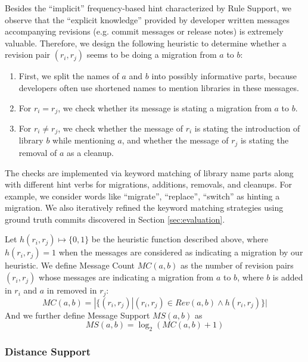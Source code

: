 \documentclass[conference, 10pt]{IEEEtran}
\begin{document}
Besides the ``implicit'' frequency-based hint characterized by Rule Support, we observe that the ``explicit knowledge'' provided by developer written messages accompanying revisions (e.g. commit messages or release notes) is extremely valuable.
Therefore, we design the following heuristic to determine whether a revision pair $(r_i, r_j)$ seems to be doing a migration from $a$ to $b$:
\begin{enumerate}
    \item First, we split the names of $a$ and $b$ into possibly informative parts, because developers often use shortened names to mention libraries in these messages.
    \item For $r_i = r_j$, we check whether its message is stating a migration from $a$ to $b$.
    \item For $r_i \ne r_j$, we check whether the message of $r_i$ is stating the introduction of library $b$ while mentioning $a$, and whether the message of $r_j$ is stating the removal of $a$ as a cleanup.
\end{enumerate}
The checks are implemented via keyword matching of library name parts along with different hint verbs for migrations, additions, removals, and cleanups. 
For example, we consider words like ``migrate'', ``replace'', ``switch'' as hinting a migration. 
We also iteratively refined the keyword matching strategies using ground truth commits discovered in Section \ref{sec:evaluation}.

Let $h(r_i, r_j)\mapsto \{0,1\}$ be the heuristic function described above, where $h(r_i,r_j)=1$ when the messages are considered as indicating a migration by our heuristic.
We define Message Count $MC(a,b)$ as the number of revision pairs $(r_i, r_j)$ whose messages are indicating a migration from $a$ to $b$, where $b$ is added in $r_i$ and $a$ in removed in $r_j$:
\begin{equation}
    MC(a,b)=|\{(r_i,r_j) | (r_i,r_j) \in Rev(a,b) \land h(r_i, r_j)\}|
\end{equation}
And we further define Message Support $MS(a,b)$ as
\begin{equation}
    MS(a,b)=\log_2(MC(a,b)+1)
\end{equation}

\subsubsection{Distance Support} 
\end{document}
